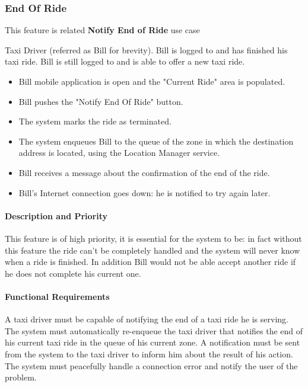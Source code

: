 \subsubsection{End Of Ride}
This feature is related \textbf{Notify End of Ride} use case
\begin{itemize}
	 Taxi Driver (referred as Bill for brevity).
	 Bill is logged to \myTaxiService{} and has finished his taxi ride.
	 Bill is still logged to \myTaxiService{} and is able to offer a new taxi ride.
	\begin{itemize}
		\item Bill \myTaxiService{} mobile application is open and the "Current Ride" area is populated.
		\item Bill pushes the "Notify End Of Ride" button.
		\item The system marks the ride as terminated.
		\item The system enqueues Bill to the queue of the zone in which the destination address is located, using the Location Manager service.
		\item Bill receives a message about the confirmation of the end of the ride. 
	\end{itemize}
	\begin{itemize}
		\item Bill's Internet connection goes down: he is notified to try again later.
	\end{itemize}
\end{itemize}
\paragraph{Description and Priority}
This feature is of high priority, it is essential for the system to be: in fact without this feature the ride can't be completely handled and the system will never know when a ride is finished.
In addition Bill would not be able accept another ride if he does not complete his current one.
\paragraph{Functional Requirements}
\begin{itemize}
	 A taxi driver must be capable of notifying the end of a taxi ride he is serving.
	 The system must automatically re-enqueue the taxi driver that notifies the end of his current taxi ride in the queue of his current zone.
	 A notification must be sent from the system to the taxi driver to inform him about the result of his action.
	 The system must peacefully handle a connection error and notify the user of the problem.
\end{itemize}
